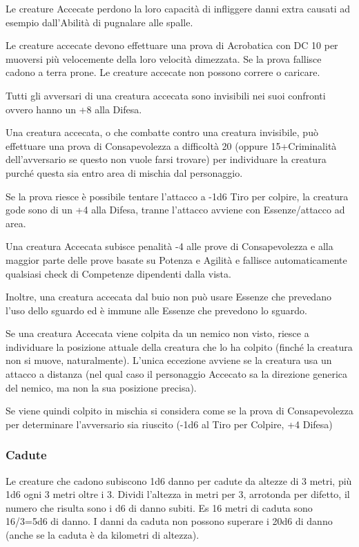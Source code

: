 \documentclass[a4paper,11pt,twoside,openany]{book}
\begin{document}
\label{accecato}

Le creature Accecate perdono la loro capacità di infliggere danni extra causati ad esempio dall'Abilità di pugnalare alle spalle.

Le creature accecate devono effettuare una prova di Acrobatica con DC 10 per muoversi più velocemente della loro velocità dimezzata. Se la prova fallisce cadono a terra prone. Le creature accecate non possono correre o caricare.

Tutti gli avversari di una creatura accecata sono invisibili nei suoi confronti ovvero hanno un +8 alla Difesa.

Una creatura accecata, o che combatte contro una creatura invisibile, può effettuare una prova di Consapevolezza a difficoltà 20 (oppure 15+Criminalità dell'avversario se questo non vuole farsi trovare) per individuare la creatura purché questa sia entro area di mischia dal personaggio.

Se la prova riesce è possibile tentare l'attacco a -1d6 Tiro per colpire, la creatura gode sono di un +4 alla Difesa, tranne l'attacco avviene con Essenze/attacco ad area.

Una creatura Accecata subisce penalità -4 alle prove di Consapevolezza e alla maggior parte delle prove basate su Potenza e Agilità e fallisce automaticamente qualsiasi check di Competenze dipendenti dalla vista.

Inoltre, una creatura accecata dal buio non può usare Essenze che prevedano l'uso dello sguardo ed è immune alle Essenze che prevedono lo sguardo.

Se una creatura Accecata viene colpita da un nemico non visto, riesce a individuare la posizione attuale della creatura che lo ha colpito (finché la creatura non si muove, naturalmente). L'unica eccezione avviene se la creatura usa un attacco a distanza (nel qual caso il personaggio Accecato sa la direzione generica del nemico, ma non la sua posizione precisa).

Se viene quindi colpito in mischia si considera come se la prova di Consapevolezza per determinare l'avversario sia riuscito (-1d6 al Tiro per Colpire, +4 Difesa)

\subsubsection{Cadute}

\label{cadute}

Le creature che cadono subiscono 1d6 danno per cadute da altezze di 3 metri, più 1d6 ogni 3 metri oltre i 3. Dividi l'altezza in metri per 3, arrotonda per difetto, il numero che risulta sono i d6 di danno subiti. Es 16 metri di caduta sono 16/3=5d6 di danno. I danni da caduta non possono superare i 20d6 di danno (anche se la caduta è da kilometri di altezza).
\end{document}
